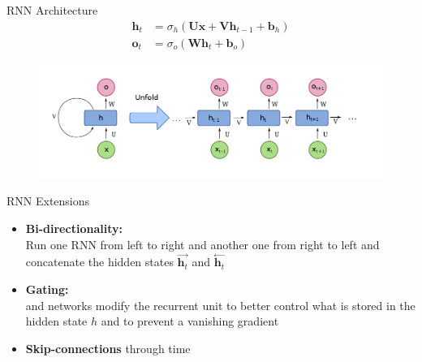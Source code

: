 \begin{frame}{RNN Architecture}{}
	\begin{align*}
		\bm{h}_t &= \sigma_h(\bm{U} \bm{x} + \bm{V} \bm{h}_{t - 1} + \bm{b}_h) \\
		\bm{o}_t &= \sigma_o(\bm{W} \bm{h}_t + \bm{b}_o)
	\end{align*}

	\vspace*{-2mm}
	\begin{figure}
		\centering
		\includegraphics[scale=0.35]{10_deep_learning/02_img/rnn}
	\end{figure}
\end{frame}


\begin{frame}{RNN Extensions}{}\optional
	\begin{itemize}
		\item \textbf{Bi-directionality:} \\
			Run one RNN from left to right and another one from right to left and concatenate the hidden states
			$\overset{\rightarrow}{\bm{h}_t}$ and $\overset{\leftarrow}{\bm{h}_t}$
		\item \textbf{Gating:} \\
			 and  networks modify the recurrent unit
			to better control what is stored in the hidden state $h$ and to prevent a vanishing gradient
		\item \textbf{Skip-connections} through time
	\end{itemize}
\end{frame}


